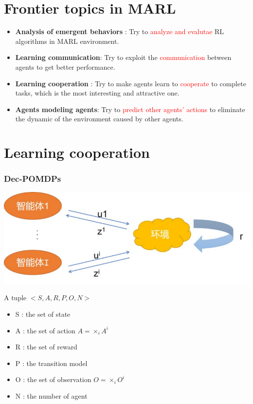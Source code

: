 \documentclass[notheorems, aspectratio=54]{beamer}
\begin{document}
\section{Frontier topics in MARL}
\begin{frame}
\begin{itemize}
\frametitle{Categorizes}
\item \textbf{Analysis of emergent behaviors} : Try to \textcolor{red}{analyze and evalutae} RL algorithms in MARL environment.
\item \textbf{Learning communication}: Try to exploit the \textcolor{red}{communication} between agents to get better performance. 
\item \textbf{Learning cooperation} : Try to make agents learn to \textcolor{red}{cooperate} to complete tasks, which is the most interesting and attractive one.
\item \textbf{Agents modeling agents}: Try to \textcolor{red}{predict other agents' actions} to eliminate the dynamic of the environment caused by other agents. 
\end{itemize}
\end{frame}

\section{Learning cooperation}

\begin{frame}
  \frametitle{Dec-POMDPs}
  \begin{minipage}{0.45\textwidth}
    \includegraphics[width=\textwidth]{dec_pomdp.png}
  \end{minipage}
  \hspace{0.05\linewidth} 
  \begin{minipage}{0.45\textwidth}
    \begin{center}
    A tuple $<S, A, R, P, O, N>$
    \end{center}
   \begin{itemize}
     \item S : the set of state
     \item A : the set of action $A = \times_{i}A^{i}$
     \item R : the set of reward 
     \item P : the transition model
     \item O : the set of observation $O = \times_{i}O^{i}$
     \item N : the number of agent
   \end{itemize}
  
  \end{minipage}
\end{frame}
\end{document}
